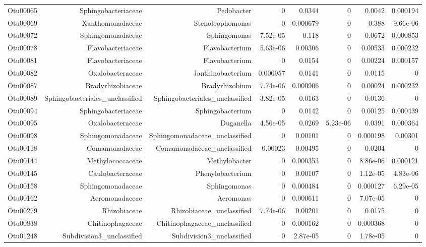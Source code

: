 \documentclass[]{article}
\begin{document}
\begin{table}[ht]
\begin{tabular}{crrrrrrr}
  Otu00065 & Sphingobacteriaceae & Pedobacter & 0 & 0.0344 & 0 & 0.0042 & 0.000194 \\ 
  Otu00069 & Xanthomonadaceae & Stenotrophomonas & 0 & 0.000679 & 0 & 0.388 & 9.66e-06 \\ 
  Otu00072 & Sphingomonadaceae & Sphingomonas & 7.52e-05 & 0.118 & 0 & 0.0672 & 0.000853 \\ 
  Otu00078 & Flavobacteriaceae & Flavobacterium & 5.63e-06 & 0.00306 & 0 & 0.00533 & 0.000232 \\ 
  Otu00081 & Flavobacteriaceae & Flavobacterium & 0 & 0.0154 & 0 & 0.00224 & 0.000157 \\ 
  Otu00082 & Oxalobacteraceae & Janthinobacterium & 0.000957 & 0.0141 & 0 & 0.0115 & 0 \\ 
  Otu00087 & Bradyrhizobiaceae & Bradyrhizobium & 7.74e-06 & 0.000906 & 0 & 0.00024 & 0.000232 \\ 
  Otu00089 & Sphingobacteriales\_unclassified & Sphingobacteriales\_unclassified & 3.82e-05 & 0.0163 & 0 & 0.0136 & 0 \\ 
  Otu00094 & Sphingobacteriaceae & Sphingobacterium & 0 & 0.0142 & 0 & 0.00125 & 0.000439 \\ 
  Otu00095 & Oxalobacteraceae & Duganella & 4.56e-05 & 0.0269 & 5.23e-06 & 0.0391 & 0.000364 \\ 
  Otu00098 & Sphingomonadaceae & Sphingomonadaceae\_unclassified & 0 & 0.00101 & 0 & 0.000198 & 0.00301 \\ 
  Otu00118 & Comamonadaceae & Comamonadaceae\_unclassified & 0.00023 & 0.00495 & 0 & 0.0204 & 0 \\ 
  Otu00144 & Methylococcaceae & Methylobacter & 0 & 0.000353 & 0 & 8.86e-06 & 0.000121 \\ 
  Otu00145 & Caulobacteraceae & Phenylobacterium & 0 & 0.00107 & 0 & 1.12e-05 & 4.83e-06 \\ 
  Otu00158 & Sphingomonadaceae & Sphingomonas & 0 & 0.000484 & 0 & 0.000127 & 6.29e-05 \\ 
  Otu00162 & Aeromonadaceae & Aeromonas & 0 & 0.000611 & 0 & 7.07e-05 & 0 \\ 
  Otu00279 & Rhizobiaceae & Rhizobiaceae\_unclassified & 7.74e-06 & 0.00201 & 0 & 0.0175 & 0 \\ 
  Otu00838 & Chitinophagaceae & Chitinophagaceae\_unclassified & 0 & 0.000162 & 0 & 0.000368 & 0 \\ 
  Otu01248 & Subdivision3\_unclassified & Subdivision3\_unclassified & 0 & 2.87e-05 & 0 & 1.78e-05 & 0 \\ 
   \hline
\end{tabular}
\end{table}
\end{document}
